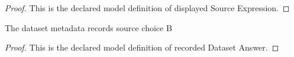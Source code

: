 \begin{proof}
  This is the declared model definition of displayed Source Expression.
\end{proof}
\begin{definition}
  \label{def:physics:phyx-mini-0983:phyxminiproblems-problemphyxmini0983-recordeddatasetanswer}
  The dataset metadata records source choice B
\end{definition}
\begin{proof}
  This is the declared model definition of recorded Dataset Answer.
\end{proof}
